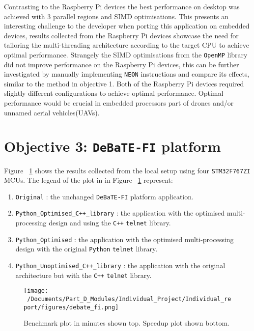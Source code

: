 Contrasting to the Raspberry Pi devices the best performance on desktop was achieved with 3 parallel regions and SIMD optimisations. This presents an interesting challenge to the developer when porting this application on embedded devices, results collected from the Raspberry Pi devices showcase the need for tailoring the multi-threading architecture according to the target CPU to achieve optimal performance. Strangely the SIMD optimisations from the \texttt{OpenMP} library did not improve performance on the Raspberry Pi devices, this can be further investigated by manually implementing \texttt{NEON} instructions and compare its effects, similar to the method in objective 1. Both of the Raspberry Pi devices required slightly different configurations to achieve optimal performance. Optimal performance would be crucial in embedded processors part of drones and/or unnamed aerial vehicles(UAVs)\cite{drones_UAV_MLDL}. 

\section{Objective 3: \texttt{DeBaTE-FI} platform}

Figure ~\ref{fig:debate_fi_plot} shows the results collected from the local setup using four \texttt{STM32F767ZI} MCUs. The legend of the plot in in Figure ~\ref{fig:debate_fi_plot} represent:

\begin{enumerate}
	\item \texttt{Original} : the unchanged \texttt{DeBaTE-FI} platform application. 
	\item \texttt{Python\_Optimised\_C++\_library} : the application with the optimised multi-processing design and using the \texttt{C++} \texttt{telnet} library.
	\item \texttt{Python\_Optimised} : the application with the optimised multi-processing design with the original \texttt{Python} \texttt{telnet} library.
	\item \texttt{Python\_Unoptimised\_C++\_library} : the application with the original architecture but with the \texttt{C++} \texttt{telnet} library.
\end{enumerate}

\begin{figure}[htbp] %
	\centering
	\texttt{[image: ~/Documents/Part\_D\_Modules/Individual\_Project/Individual\_report/figures/debate\_fi.png]} %
	\caption{Benchmark plot in minutes shown top. Speedup plot shown bottom.}
	\label{fig:debate_fi_plot} %
\end{figure}

